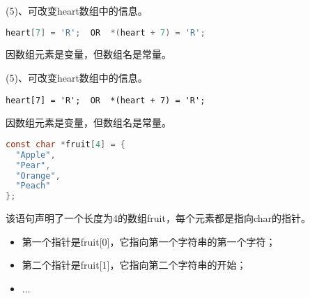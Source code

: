 \begin{frame}[fragile]
(5)、可改变heart数组中的信息。
\begin{lstlisting}[language=c,showstringspaces=true]
heart[7] = 'R';  OR  *(heart + 7) = 'R';
\end{lstlisting}
\vspace{0.05in}

因数组元素是变量，但数组名是常量。
\end{frame}

\begin{frame}[fragile]
(5)、可改变heart数组中的信息。
\begin{lstlisting}[basicstyle=\ttfamily,showstringspaces=true]
heart[7] = 'R';  OR  *(heart + 7) = 'R';
\end{lstlisting}
\vspace{0.05in}

因数组元素是变量，但数组名是常量。
\end{frame}

\begin{frame}[fragile]
\begin{lstlisting}[language=c,showstringspaces=true]
const char *fruit[4] = {
  "Apple",
  "Pear",
  "Orange",
  "Peach"
};
\end{lstlisting}
\vspace{0.05in}

该语句声明了一个长度为4的数组fruit，每个元素都是指向char的指针。
\vspace{0.05in}

\begin{itemize}
\item 第一个指针是fruit[0]，它指向第一个字符串的第一个字符；
\item 第二个指针是fruit[1]，它指向第二个字符串的开始；
\item ...
\end{itemize}
\end{frame}